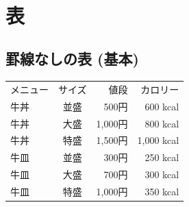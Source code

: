 \documentclass[a4paper,11pt]{jsarticle}
\begin{document}
  　\newpage
    \section{表}
      \subsection{罫線なしの表 (基本)}
    \begin{table}[htb]
      \begin{tabular}{lcrr}
        メニュー & サイズ & 値段 & カロリー \\
        牛丼 & 並盛 & 500円 & 600 kcal \\
        牛丼 & 大盛 & 1,000円 & 800 kcal \\
        牛丼 & 特盛 & 1,500円 & 1,000 kcal \\
        牛皿 & 並盛 & 300円 & 250 kcal \\
        牛皿 & 大盛 & 700円 & 300 kcal \\
        牛皿 & 特盛 & 1,000円 & 350 kcal
      \end{tabular}
    \end{table}
\end{document}
